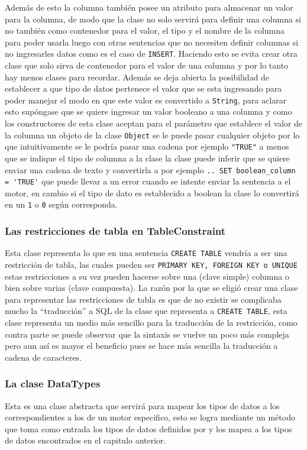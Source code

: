 Además de esto la columna también posee un atributo para almacenar un valor para la columna, de modo que la clase no solo servirá para definir una columna si no también como contenedor para el valor, el tipo y el nombre  de la columna para poder usarla luego con otras sentencias que no necesiten definir columnas si no ingresarles datos como es el caso de \verb=INSERT=. Haciendo esto se evita crear otra clase que solo sirva de contenedor para el valor de una columna y por lo tanto hay menos clases para recordar. Además se deja abierta la posibilidad de establecer a que tipo de datos pertenece el valor que se esta ingresando para poder manejar el modo en que este valor es convertido a \verb=String=, para aclarar esto supóngase que se quiere ingresar un valor booleano a una columna y como los constructores de esta clase aceptan para el parámetro que establece el valor de la columna un objeto de la clase \verb=Object= se le puede pasar cualquier objeto por lo que intuitivamente se le podría pasar una cadena  por ejemplo \verb|"TRUE"| a menos que se indique el tipo de columna a la clase la clase puede inferir que se quiere enviar una cadena de texto y convertirla a  por ejemplo \verb|.. SET boolean_column = 'TRUE'| que puede llevar a un error cuando se intente enviar la sentencia a el motor, en cambio si el tipo de dato es establecido a boolean la clase lo convertirá en un \verb=1= o \verb=0= según corresponda.
%
\subsubsection{Las restricciones de tabla en TableConstraint}
Esta clase representa lo que en una sentencia \verb=CREATE TABLE= vendría a ser una restricción de tabla, las cuales pueden ser \verb=PRIMARY KEY, FOREIGN KEY o UNIQUE= estas restricciones a su vez pueden hacerse sobre una (clave simple) columna o bien sobre varias (clave compuesta). La razón por la que se eligió crear una clase para representar las restricciones de tabla es que de no existir se complicaba mucho la ``traducción'' a SQL de la clase que representa a \verb=CREATE TABLE=, esta clase representa un medio más sencillo para la traducción de la restricción, como contra parte se puede observar que la sintaxis se vuelve un poco más compleja pero aun así es mayor el beneficio pues se hace más sencilla la traducción a cadena de caracteres. 
%
\subsubsection{La clase DataTypes}
Esta es una clase abstracta que servirá para mapear los tipos de datos a los correspondientes a los de un motor especifico, esto se logra mediante un método que toma como entrada los tipos de datos definidos por \jd y los mapea a los tipos de datos encontrados en el capitulo anterior.
%

